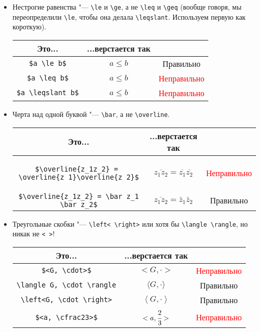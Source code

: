 \documentclass[12pt,a4paper]{book}
\newcommand{\ok}{& \textcolor{green!60!black}{Правильно}}
\newcommand{\bad}{& \textcolor{red}{Неправильно}}
\begin{document}
\begin{enumerate}
\begin{itemize}
\begin{center}
\begin{tabular}{|c|c|c|}
\hline
\end{tabular}\end{center}
\item Нестрогие равенства "--- \verb'\le' и \verb'\ge', а не \verb'\leq' и \verb'\geq' (вообще говоря, мы переопределили \verb'\le', чтобы она делала \verb'\leqslant'. Используем первую как короткую).
\begin{center}\begin{tabular}{|c|c|c|}
\hline Это... & ...верстается так & \\
\hline \verb'$a \le b$' & $a \le b$ \ok \\
\hline \verb'$a \leq b$' & $a \leq b$ \bad \\
\hline \verb'$a \leqslant b$' & $a \leqslant b$ \bad \\
\hline
\end{tabular}\end{center}
\item Черта над одной буквой "--- \verb'\bar', а не \verb'\overline'.
\begin{center}\begin{tabular}{|c|c|c|}
\hline Это... & ...верстается так & \\
\hline
\begin{minipage}{6cm}
\begin{verbatim}
$\overline{z_1z_2} = 
\overline{z_1}\overline{z_2}$
\end{verbatim}
\end{minipage}
& $\overline{z_1z_2} = \overline{z_1}\overline{z_2}$ \bad \\
\hline \verb'$\overline{z_1z_2} = \bar z_1 \bar z_2$' & $\overline{z_1z_2} = \bar z_1 \bar z_2$ \ok \\
\hline
\end{tabular}\end{center}
\item Треугольные скобки "--- \verb'\left< \right>' или хотя бы \verb'\langle \rangle', но никак не \verb'< >'!
\begin{center}\begin{tabular}{|c|c|c|}
\hline Это... & ...верстается так & \\
\hline \verb'$<G, \cdot>$' & $<G, \cdot>$ \bad \\
\hline \verb'\langle G, \cdot \rangle' & $\langle G, \cdot \rangle$ \ok \\
\hline \verb'\left<G, \cdot \right>' & $\left<G, \cdot \right>$ \ok \\
\hline \verb'$<a, \cfrac23>$' & $<a, \cfrac23>$ \bad \\

\end{tabular}
\end{center}
\end{itemize}
\end{enumerate}
\end{document}
